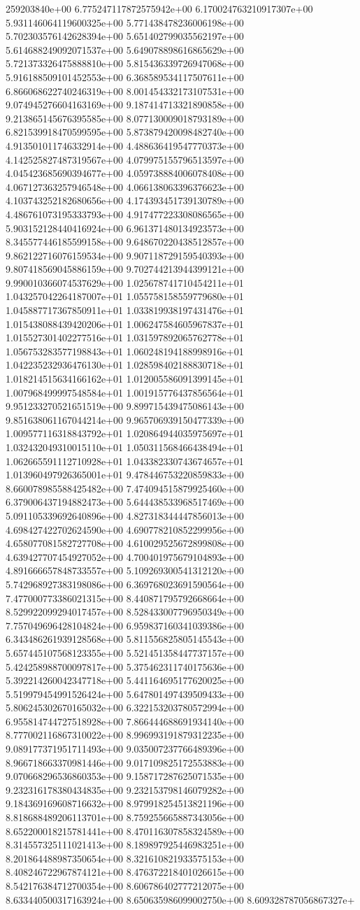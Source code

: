 259203840e+00	6.775247117872575942e+00	6.170024763210917307e+00	5.931146064119600325e+00	5.771438478236006198e+00	5.702303576142628394e+00	5.651402799035562197e+00	5.614688249092071537e+00	5.649078898616865629e+00	5.721373326475888810e+00	5.815436339726947068e+00	5.916188509101452553e+00	6.368589534117507611e+00	6.866068622740246319e+00	8.001454332173107531e+00	9.074945276604163169e+00	9.187414713321890858e+00	9.213865145676395585e+00	8.077130009018793189e+00	6.821539918470599595e+00	5.873879420098482740e+00	4.913501011746332914e+00	4.488636419547770373e+00	4.142525827487319567e+00	4.079975155796513597e+00	4.045423685690394677e+00	4.059738884006078408e+00	4.067127363257946548e+00	4.066138063396376623e+00	4.103743252182680656e+00	4.174393451739130789e+00	4.486761073195333793e+00	4.917477223308086565e+00	5.903152128440416924e+00	6.961371480134923573e+00	8.345577446185599158e+00	9.648670220438512857e+00	9.862122716076159534e+00	9.907118729159540393e+00	9.807418569045886159e+00	9.702744213944399121e+00	9.990010366074537629e+00	1.025678741710454211e+01	1.043257042264187007e+01	1.055758158559779680e+01	1.045887717367850911e+01	1.033819938197431476e+01	1.015438088439420206e+01	1.006247584605967837e+01	1.015527301402277516e+01	1.031597892065762778e+01	1.056753283577198843e+01	1.060248194188998916e+01	1.042235232936476130e+01	1.028598402188830718e+01	1.018214515634166162e+01	1.012005586091399145e+01	1.007968499997548584e+01	1.001915776437856564e+01	9.951233270521651519e+00	9.899715439475086143e+00	9.851638061167044214e+00	9.965706939150477339e+00	1.009577116318843792e+01	1.020864944035975697e+01	1.032432049310015110e+01	1.050311568466438494e+01	1.062665591112710928e+01	1.043382330743674657e+01	1.013960497926365001e+01	9.478446753220859833e+00	8.660078985588425482e+00	7.474094515879925460e+00	6.379006437194882473e+00	5.644438533968517469e+00	5.091105339692640896e+00	4.827318344447856013e+00	4.698427422702624590e+00	4.690778210852299956e+00	4.658077081582727708e+00	4.610029525672899808e+00	4.639427707454927052e+00	4.700401975679104893e+00	4.891666657848733557e+00	5.109269300541312120e+00	5.742968927383198086e+00	6.369768023691590564e+00	7.477000773386021315e+00	8.440871795792668664e+00	8.529922099294017457e+00	8.528433007796950349e+00	7.757049696428104824e+00	6.959837160341039386e+00	6.343486261939128568e+00	5.811556825805145543e+00	5.657445107568123355e+00	5.521451358447737157e+00	5.424258988700097817e+00	5.375462311740175636e+00	5.392214260042347718e+00	5.441164695177620025e+00	5.519979454991526424e+00	5.647801497439509433e+00	5.806245302670165032e+00	6.322153203780572994e+00	6.955814744727518928e+00	7.866444688691934140e+00	8.777002116867310022e+00	8.996993191879312235e+00	9.089177371951711493e+00	9.035007237766489396e+00	8.966718663370981446e+00	9.017109825172553883e+00	9.070668296536860353e+00	9.158717287625071535e+00	9.232316178380434835e+00	9.232153798146079282e+00	9.184369169608716632e+00	8.979918254513821196e+00	8.818688489206113701e+00	8.759255665887343056e+00	8.652200018215781441e+00	8.470116307858324589e+00	8.314557325111021413e+00	8.189897925446983251e+00	8.201864488987350654e+00	8.321610821933575153e+00	8.408246722967874121e+00	8.476372218401026615e+00	8.542176384712700354e+00	8.606786402777212075e+00	8.633440500317163924e+00	8.650635986099002750e+00	8.609328787056867327e+